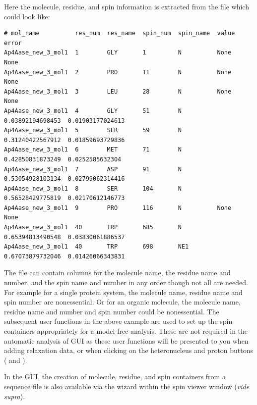 Here the molecule, residue, and spin information is extracted from the  file which could look like:

{\scriptsize \begin{verbatim}
# mol_name          res_num  res_name  spin_num  spin_name  value             error               
Ap4Aase_new_3_mol1  1        GLY       1         N          None              None                
Ap4Aase_new_3_mol1  2        PRO       11        N          None              None                
Ap4Aase_new_3_mol1  3        LEU       28        N          None              None                
Ap4Aase_new_3_mol1  4        GLY       51        N          0.03892194698453  0.01903177024613    
Ap4Aase_new_3_mol1  5        SER       59        N          0.31240422567912  0.01859693729836    
Ap4Aase_new_3_mol1  6        MET       71        N          0.42850831873249  0.0252585632304     
Ap4Aase_new_3_mol1  7        ASP       91        N          0.53054928103134  0.02799062314416    
Ap4Aase_new_3_mol1  8        SER       104       N          0.56528429775819  0.02170612146773    
Ap4Aase_new_3_mol1  9        PRO       116       N          None              None                
Ap4Aase_new_3_mol1  40       TRP       685       N          0.65394813490548  0.03830061886537    
Ap4Aase_new_3_mol1  40       TRP       698       NE1        0.67073879732046  0.01426066343831    
\end{verbatim}} \label{verb: noe.500.out}

The file can contain columns for the molecule name, the residue name and number, and the spin name and number in any order though not all are needed.
For example for a single protein system, the molecule name, residue name and spin number are nonessential.
Or for an organic molecule, the molecule name, residue name and number and spin number could be nonessential.
The subsequent user functions in the above example are used to set up the spin containers appropriately for a model-free analysis.
These are not required in the automatic analysis of GUI as these user functions will be presented to you when adding relaxation data, or when clicking on the heteronucleus and proton buttons ( and ).

In the GUI, the creation of molecule, residue, and spin containers from a sequence file is also available via the  wizard within the spin viewer window (\textit{vide supra}).



